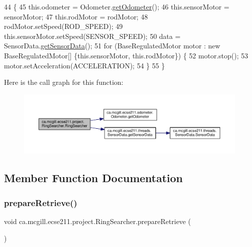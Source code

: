 \begin{DoxyCode}
44                                 \{
45     this.odometer = Odometer.\hyperlink{classca_1_1mcgill_1_1ecse211_1_1odometer_1_1_odometer_a99171f11e34dea918fa9dd069d721439}{getOdometer}();
46     this.sensorMotor = sensorMotor;
47     this.rodMotor = rodMotor;
48     rodMotor.setSpeed(ROD\_SPEED);
49     this.sensorMotor.setSpeed(SENSOR\_SPEED);
50     data = SensorData.\hyperlink{classca_1_1mcgill_1_1ecse211_1_1threads_1_1_sensor_data_a8260aba53b4474ca1275e4ce26157977}{getSensorData}();
51     \textcolor{keywordflow}{for} (BaseRegulatedMotor motor : \textcolor{keyword}{new} BaseRegulatedMotor[] \{this.sensorMotor, this.rodMotor\}) \{
52       motor.stop();
53       motor.setAcceleration(ACCELERATION);
54     \}
55   \}
\end{DoxyCode}
Here is the call graph for this function\+:
\nopagebreak
\begin{figure}[H]
\begin{center}
\leavevmode
\includegraphics[width=350pt]{classca_1_1mcgill_1_1ecse211_1_1project_1_1_ring_searcher_a37eebb6cbdfd692e0979c3ca0fe2597b_cgraph}
\end{center}
\end{figure}


\subsection{Member Function Documentation}
\mbox{\label{classca_1_1mcgill_1_1ecse211_1_1project_1_1_ring_searcher_a3de30b85b1445157d7f8572992de7651}} 
\subsubsection{\texorpdfstring{prepare\+Retrieve()}{prepareRetrieve()}}
{\footnotesize\ttfamily void ca.\+mcgill.\+ecse211.\+project.\+Ring\+Searcher.\+prepare\+Retrieve (\begin{DoxyParamCaption}{ }\end{DoxyParamCaption})}

